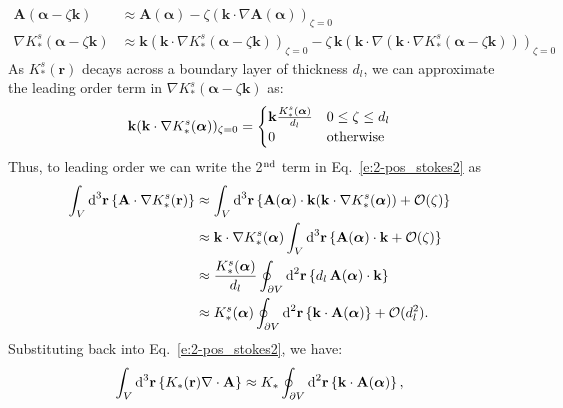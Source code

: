 \begin{align}
  \mathbf{A}(\bm{\alpha} - \zeta \mathbf{k}) &\approx \mathbf{A}(\bm{\alpha}) - \zeta (\mathbf{k} \cdot \nabla \mathbf{A}(\bm{\alpha}))_{\zeta = 0} \label{e:2-expandA} \\
  \nabla K_*^s(\bm{\alpha} - \zeta \mathbf{k}) &\approx \mathbf{k} (\mathbf{k} \cdot \nabla K_*^s(\bm{\alpha} - \zeta \mathbf{k}))_{\zeta = 0} - \zeta\, \mathbf{k}(\mathbf{k} \cdot \nabla (\mathbf{k} \cdot \nabla K_*^s(\bm{\alpha} - \zeta \mathbf{k})))_{\zeta = 0}
\end{align}
As $K_*^s(\mathbf{r})$ decays across a boundary layer of thickness $d_l$, we can approximate the leading order term in $\nabla K_*^s(\bm{\alpha} - \zeta \mathbf{k})$ as:
\begin{equation}
  \mathbf{k} (\mathbf{k} \cdot \nabla K_*^s(\bm{\alpha}))_{\zeta = 0} =
  \begin{cases}
    \mathbf{k}\frac{K_*^s(\bm{\alpha})}{d_l} & 0 \leq \zeta \leq d_l \\
    0 & \textup{otherwise}
  \end{cases}
\end{equation}
Thus, to leading order we can write the 2$^\textrm{\rm nd}$ term in Eq.~\ref{e:2-pos_stokes2} as
\begin{align}
  \int_{V} \textup{d}^3\mathbf{r} \left \{ \mathbf{A} \cdot \nabla K_{*}^s (\mathbf{r}) \right \} & \approx
  \int_{V} \textup{d}^3\mathbf{r} \left \{\mathbf{A}(\bm{\alpha}) \cdot \mathbf{k}(\mathbf{k} \cdot \nabla K_*^s(\bm{\alpha}))  + \mathcal{O}(\zeta) \right \} \\ & \approx
  \mathbf{k} \cdot \nabla K_*^s(\bm{\alpha}) \int_{V} \textup{d}^3\mathbf{r}\left \{\mathbf{A}(\bm{\alpha}) \cdot \mathbf{k} + \mathcal{O}(\zeta) \right \} \\ & \approx
  \frac{K_*^s(\bm{\alpha})}{d_l} \oint_{\partial V} \textup{d}^2\mathbf{r}\left \{d_l\,\mathbf{A}(\bm{\alpha}) \cdot \mathbf{k} \right \} \\ & \approx
  K_*^s(\bm{\alpha}) \oint_{\partial V} \textup{d}^2\mathbf{r}\left \{ \mathbf{k}  \cdot \mathbf{A}(\bm{\alpha}) \right \} + \mathcal{O}(d_l^2).
\end{align}
Substituting back into Eq.~\ref{e:2-pos_stokes2}, we have:
\begin{equation}
  \int_{V}\textup{d}^3\mathbf{r} \left \{ K_{*} (\mathbf{r}) \nabla \cdot \mathbf{A} \right \} \approx
  K_* \oint_{\partial V} \textup{d}^2\mathbf{r} \left \{ \mathbf{k} \cdot \mathbf{A}(\bm{\alpha})\right \},\label{e:2-positionF24}
\end{equation}
